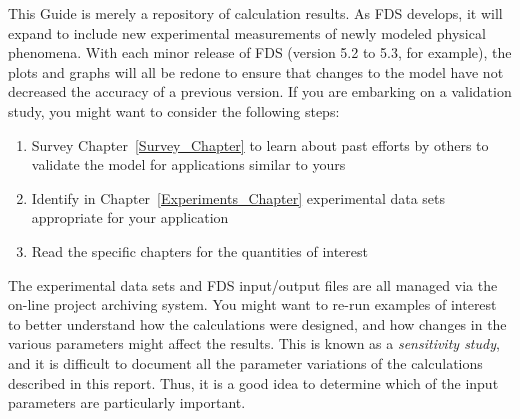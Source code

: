 This Guide is merely a repository of calculation results. As FDS develops, it will expand to include new experimental measurements of newly modeled
physical phenomena. With each minor release of FDS (version 5.2 to 5.3, for example), the plots and graphs will all be redone to ensure that changes to
the model have not decreased the accuracy of a previous version. If you are embarking on a validation study, you might want to consider the following steps:
\begin{enumerate}
\item Survey Chapter~\ref{Survey_Chapter} to learn about past efforts by others to validate the model for applications similar to yours 
\item Identify in Chapter~\ref{Experiments_Chapter} experimental data sets appropriate for your application
\item Read the specific chapters for the quantities of interest
\end{enumerate}
The experimental data sets and FDS input/output files are all managed via the on-line project archiving system. You might want to re-run examples of interest
to better understand how the calculations were designed, and how changes in the various parameters might affect the results. This is known as a {\em sensitivity study},
and it is difficult to document all the parameter variations of the calculations described in this report. Thus, it is a good idea to determine which of the input
parameters are particularly important. 

